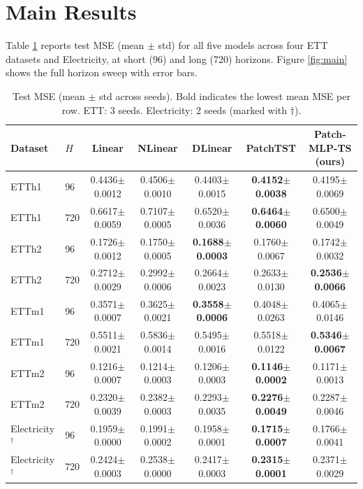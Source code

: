 \documentclass[conference]{IEEEtran}
\begin{document}
\section{Main Results}

Table \ref{tab:main} reports test MSE (mean $\pm$ std) for all five models across
four ETT datasets and Electricity, at short (96) and long (720) horizons. Figure
\ref{fig:main} shows the full horizon sweep with error bars.

\begin{table}[t]
\caption{Test MSE (mean $\pm$ std across seeds). Bold indicates the lowest mean MSE
per row. ETT: 3 seeds. Electricity: 2 seeds (marked with $\dagger$).}
\label{tab:main}
\centering
\small
\begin{tabular}{llccccc}
\toprule
Dataset & $H$ & Linear & NLinear & DLinear & PatchTST & Patch-MLP-TS (ours) \\
\midrule
ETTh1 & 96  & 0.4436$\pm$0.0012 & 0.4506$\pm$0.0010 & 0.4403$\pm$0.0015 & \textbf{0.4152$\pm$0.0038} & 0.4195$\pm$0.0069 \\
ETTh1 & 720 & 0.6617$\pm$0.0059 & 0.7107$\pm$0.0005 & 0.6520$\pm$0.0036 & \textbf{0.6464$\pm$0.0060} & 0.6500$\pm$0.0049 \\
ETTh2 & 96  & 0.1726$\pm$0.0012 & 0.1750$\pm$0.0005 & \textbf{0.1688$\pm$0.0003} & 0.1760$\pm$0.0067 & 0.1742$\pm$0.0032 \\
ETTh2 & 720 & 0.2712$\pm$0.0029 & 0.2992$\pm$0.0006 & 0.2664$\pm$0.0023 & 0.2633$\pm$0.0130 & \textbf{0.2536$\pm$0.0066} \\
ETTm1 & 96  & 0.3571$\pm$0.0007 & 0.3625$\pm$0.0021 & \textbf{0.3558$\pm$0.0006} & 0.4048$\pm$0.0263 & 0.4065$\pm$0.0146 \\
ETTm1 & 720 & 0.5511$\pm$0.0021 & 0.5836$\pm$0.0014 & 0.5495$\pm$0.0016 & 0.5518$\pm$0.0122 & \textbf{0.5346$\pm$0.0067} \\
ETTm2 & 96  & 0.1216$\pm$0.0007 & 0.1214$\pm$0.0003 & 0.1206$\pm$0.0003 & \textbf{0.1146$\pm$0.0002} & 0.1171$\pm$0.0013 \\
ETTm2 & 720 & 0.2320$\pm$0.0039 & 0.2382$\pm$0.0003 & 0.2293$\pm$0.0035 & \textbf{0.2276$\pm$0.0049} & 0.2287$\pm$0.0046 \\
Electricity$^\dagger$ & 96  & 0.1959$\pm$0.0000 & 0.1991$\pm$0.0002 & 0.1958$\pm$0.0001 & \textbf{0.1715$\pm$0.0007} & 0.1766$\pm$0.0041 \\
Electricity$^\dagger$ & 720 & 0.2424$\pm$0.0003 & 0.2538$\pm$0.0000 & 0.2417$\pm$0.0003 & \textbf{0.2315$\pm$0.0001} & 0.2371$\pm$0.0029 \\
\bottomrule
\end{tabular}
\end{table}
\end{document}
